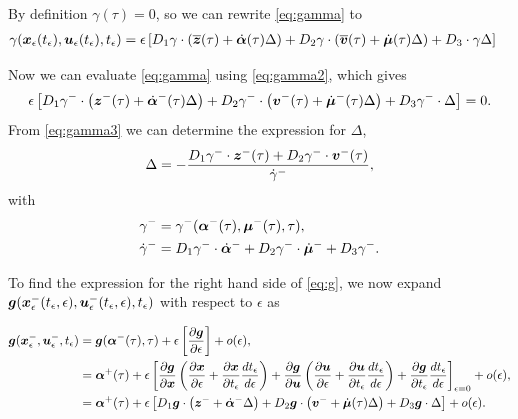 \documentclass[../DC2017114Bouma.tex]{subfiles}
\begin{document}
By definition $\gamma(\tau) = 0$, so we can rewrite \eqref{eq:gamma} to
\begin{align}
\gamma&({\boldsymbol{x}}_\epsilon(t_\epsilon),{\boldsymbol{u}}_\epsilon(t_\epsilon),t_\epsilon) = \epsilon\left[ D_1 \gamma\cdot \left( \overline{{\boldsymbol{z}}}(\tau) + \dot{\boldsymbol{\alpha}}(\tau)\Delta\right) + D_2 \gamma\cdot  \left( \overline{{\boldsymbol{v}}}(\tau) + \dot{\boldsymbol{\mu}}(\tau) \Delta\right) + D_3\cdot  \gamma \Delta \right]\label{eq:gamma2}
\end{align}

Now we can evaluate \eqref{eq:gamma} using \eqref{eq:gamma2}, which gives
\begin{align}
\epsilon\left[ D_1 \gamma^{-}\cdot \left({\boldsymbol{z}}^{-}(\tau) + \dot{\boldsymbol{\alpha}}^{-}(\tau)\Delta\right) + D_2 \gamma^{-}\cdot  \left({\boldsymbol{v}}^{-}(\tau) + \dot{\boldsymbol{\mu}}^{-}(\tau) \Delta\right) + D_3 \gamma^{-}\cdot  \Delta \right] = 0. \label{eq:gamma3}
\end{align}
From \eqref{eq:gamma3} we can determine the expression for $\Delta$,
\begin{align}
\Delta = -\frac{D_1 \gamma^{-} \cdot {\boldsymbol{z}}^{-}(\tau) + D_2 \gamma^{-}\cdot {\boldsymbol{v}}^{-}(\tau)}{\dot{\gamma}^{-}}, \label{eq:Delta}
\end{align}
with
\begin{align}
\gamma^{-} &= \gamma^{-}(\boldsymbol{\alpha}^{-}(\tau),\boldsymbol{\mu}^{-}(\tau),\tau),\\
\dot{\gamma}^{-} &= D_1 \gamma^{-} \cdot \dot{\boldsymbol{\alpha}}^{-} + D_2 \gamma^{-}\cdot  \dot{\boldsymbol{\mu}}^{-} + D_3 \gamma^{-}.
\end{align}

To find the expression for the right hand side of \eqref{eq:g}, we now expand ${\boldsymbol{g}}({\boldsymbol{x}}^{-}_\epsilon(t_\epsilon,\epsilon),{\boldsymbol{u}}^{-}_\epsilon(t_\epsilon,\epsilon),t_\epsilon)$ with respect to $\epsilon$ as

\begin{align}
{\boldsymbol{g}}({\boldsymbol{x}}^{-}_\epsilon,{\boldsymbol{u}}^{-}_\epsilon,t_\epsilon) &= {\boldsymbol{g}}(\boldsymbol{\alpha}^-(\tau),\tau) + \epsilon\left[\frac{\partial{\boldsymbol{g}}}{\partial\epsilon}\right] + o(\epsilon),\\
&= \boldsymbol{\alpha}^+(\tau) + \epsilon\left[\frac{\partial{\boldsymbol{g}}}{\partial{\boldsymbol{x}}}\left(\frac{\partial{\boldsymbol{x}}}{\partial\epsilon} + \frac{\partial{\boldsymbol{x}}}{\partial t_\epsilon}\frac{dt_\epsilon}{d\epsilon} \right) + \frac{\partial{\boldsymbol{g}}}{\partial{\boldsymbol{u}}}\left(\frac{\partial{\boldsymbol{u}}}{\partial\epsilon} + \frac{\partial{\boldsymbol{u}}}{\partial t_\epsilon}\frac{d t_\epsilon}{d\epsilon}\right) + \frac{\partial{\boldsymbol{g}}}{\partial t_\epsilon}\frac{d t_\epsilon}{d\epsilon} \right]_{\epsilon = 0} + o(\epsilon),\\
&= \boldsymbol{\alpha}^+(\tau) + \epsilon\left[D_1{\boldsymbol{g}}\cdot \left({\boldsymbol{z}}^- + \dot{\boldsymbol{\alpha}}^-\Delta\right) + D_2{\boldsymbol{g}}\cdot \left({\boldsymbol{v}}^- + \dot{\boldsymbol{\mu}}(\tau) \Delta\right) + D_3{\boldsymbol{g}}\cdot \Delta\right] + o(\epsilon).\label{eq:gexp}
\end{align}
\end{document}
